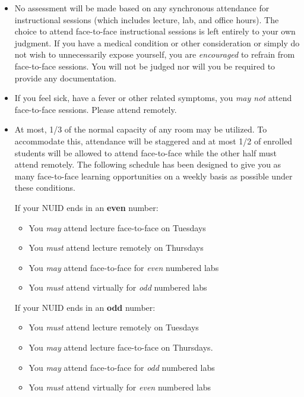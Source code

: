 \documentclass[12pt]{scrartcl}
\begin{document}
\begin{itemize}
  \item No assessment will be made based on any synchronous attendance 
  for instructional sessions (which includes lecture, lab, and 
  office hours).  The choice to attend face-to-face
  instructional sessions is left entirely to your own judgment.  If you have
  a medical condition or other consideration or simply do not wish to
  unnecessarily expose yourself, you are \emph{encouraged} to refrain
  from face-to-face sessions.  You will not be judged nor will you be
  required to provide any documentation.
  
  \item If you feel sick, have a fever or other related symptoms, you
  \emph{may not} attend face-to-face sessions.  Please attend remotely.
  
  \item At most, 1/3 of the normal capacity of any room may be utilized.
  To accommodate this, attendance will be staggered and at most 1/2 of
  enrolled students will be allowed to attend face-to-face while the 
  other half must attend remotely.  The following schedule has been
  designed to give you as many face-to-face learning opportunities 
  on a weekly basis as possible under these conditions.
  
  If your NUID ends in an \textbf{even} number:
  \begin{itemize}
    \item You \emph{may} attend lecture face-to-face on Tuesdays 
    \item You \emph{must} attend lecture remotely on Thursdays
    \item You \emph{may} attend face-to-face for \emph{even} numbered labs
    \item You \emph{must} attend virtually for \emph{odd} numbered labs
  \end{itemize}
  If your NUID ends in an \textbf{odd} number:
  \begin{itemize}
    \item You \emph{must} attend lecture remotely on Tuesdays 
    \item You \emph{may} attend lecture face-to-face on Thursdays.
    \item You \emph{may} attend face-to-face for \emph{odd} numbered labs
    \item You \emph{must} attend virtually for \emph{even} numbered labs
  \end{itemize}



\end{itemize}
\end{document}
